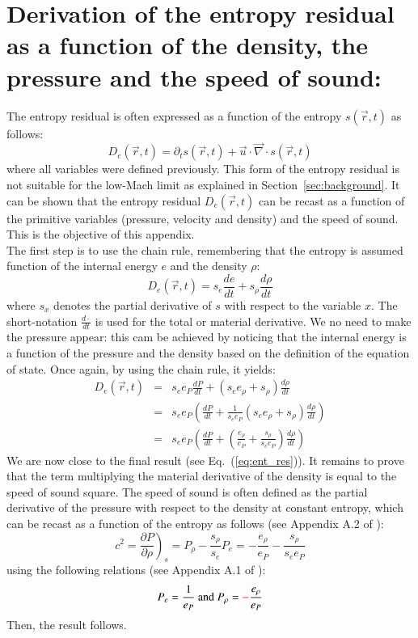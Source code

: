 \documentclass[preprint,10pt]{elsarticle}
\renewcommand{\div}{\vec{\nabla}\! \cdot \!}
\newcommand{\eqt}[1]{Eq.~(\ref{#1})}                     %
\newcommand{\sct}[1]{Section~\ref{#1}}                   %
\newcommand{\tcr}[1]{\textcolor{red}{#1}}
\begin{document}
\section{Derivation of the entropy residual as a function of the density, the pressure and the speed of sound:} \label{app:ent_res}
The entropy residual is often expressed as a function of the entropy $s(\vec{r},t)$ as follows:
\begin{equation}
D_e(\vec{r},t) = \partial_t s (\vec{r},t) + \vec{u} \cdot \div s (\vec{r},t) \nonumber
\end{equation}
where all variables were defined previously. This form of the entropy residual is not suitable for the low-Mach limit as explained in \sct{sec:background}. It can be shown that the entropy residual $D_e(\vec{r},t)$ can be recast as a function of the primitive variables (pressure, velocity and density) and the speed of sound. This is the objective of this appendix. \\
The first step is to use the chain rule, remembering that the entropy is assumed function of the internal energy $e$ and the density $\rho$:
\begin{equation}
D_e(\vec{r},t) = s_e \frac{d e}{dt} + s_{\rho} \frac{d \rho}{dt} \nonumber
\end{equation}
where $s_x$ denotes the partial derivative of $s$ with respect to the variable $x$. The short-notation $\frac{d \cdot}{dt}$ is used for the total or material derivative. We no need to make the pressure appear: this cam be achieved by noticing that the internal energy is a function of the pressure and the density based on the definition of the equation of state. Once again, by using the chain rule, it yields:
\begin{eqnarray}
D_e(\vec{r},t) &=&  s_e e_P \frac{d P}{dt} + ( s_e e_{\rho} + s_{\rho} ) \frac{d \rho}{dt} \nonumber \\
&=& s_e e_P \left( \frac{d P}{dt} + \frac{1}{s_e e_P} ( s_e e_{\rho} + s_{\rho} ) \frac{d \rho}{dt} \right) \nonumber \\
&=& s_e e_P \left( \frac{d P}{dt} + ( \frac{e_{\rho}}{e_P} + \frac{s_{\rho}}{s_e e_P} ) \frac{d \rho}{dt} \right) \nonumber 
\end{eqnarray}
We are now close to the final result (see \eqt{eq:ent_res}). It remains to prove that the term multiplying the material derivative of the density is equal to the speed of sound square. The speed of sound is often defined as the partial derivative of the pressure with respect to the density at constant entropy, which can be recast as a function of the entropy as follows (see Appendix A.2 of \cite{jlg}):
\begin{equation}
c^2 = \left. \frac{\partial P}{\partial \rho} \right)_s = P_{\rho} - \frac{s_{\rho}}{s_e} P_e = - \frac{e_{\rho}}{e_P} - \frac{s_{\rho}}{s_e e_P} \nonumber
\end{equation}
using the following relations (see Appendix A.1 of \cite{jlg}):
\begin{equation}
P_e = \frac{1}{e_P} \text{ and } P_{\rho} = \tcr{-}\frac{e_{\rho}}{e_P} \nonumber
\end{equation}
Then, the result follows.
\newpage
\end{document}
